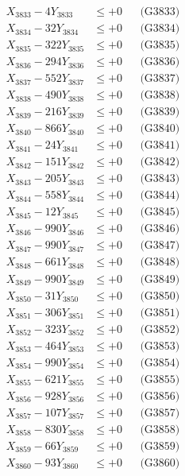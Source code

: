 \documentclass[a4paper,10pt]{article}
\begin{document}
{\begin{align}
X_{3833} - 4Y_{3833} &\leq +0 && \text{(G3833)} \\
X_{3834} - 32Y_{3834} &\leq +0 && \text{(G3834)} \\
X_{3835} - 322Y_{3835} &\leq +0 && \text{(G3835)} \\
X_{3836} - 294Y_{3836} &\leq +0 && \text{(G3836)} \\
X_{3837} - 552Y_{3837} &\leq +0 && \text{(G3837)} \\
X_{3838} - 490Y_{3838} &\leq +0 && \text{(G3838)} \\
X_{3839} - 216Y_{3839} &\leq +0 && \text{(G3839)} \\
X_{3840} - 866Y_{3840} &\leq +0 && \text{(G3840)} \\
\allowbreak
X_{3841} - 24Y_{3841} &\leq +0 && \text{(G3841)} \\
X_{3842} - 151Y_{3842} &\leq +0 && \text{(G3842)} \\
X_{3843} - 205Y_{3843} &\leq +0 && \text{(G3843)} \\
X_{3844} - 558Y_{3844} &\leq +0 && \text{(G3844)} \\
X_{3845} - 12Y_{3845} &\leq +0 && \text{(G3845)} \\
X_{3846} - 990Y_{3846} &\leq +0 && \text{(G3846)} \\
X_{3847} - 990Y_{3847} &\leq +0 && \text{(G3847)} \\
X_{3848} - 661Y_{3848} &\leq +0 && \text{(G3848)} \\
X_{3849} - 990Y_{3849} &\leq +0 && \text{(G3849)} \\
X_{3850} - 31Y_{3850} &\leq +0 && \text{(G3850)} \\
\allowbreak
X_{3851} - 306Y_{3851} &\leq +0 && \text{(G3851)} \\
X_{3852} - 323Y_{3852} &\leq +0 && \text{(G3852)} \\
X_{3853} - 464Y_{3853} &\leq +0 && \text{(G3853)} \\
X_{3854} - 990Y_{3854} &\leq +0 && \text{(G3854)} \\
X_{3855} - 621Y_{3855} &\leq +0 && \text{(G3855)} \\
X_{3856} - 928Y_{3856} &\leq +0 && \text{(G3856)} \\
X_{3857} - 107Y_{3857} &\leq +0 && \text{(G3857)} \\
X_{3858} - 830Y_{3858} &\leq +0 && \text{(G3858)} \\
X_{3859} - 66Y_{3859} &\leq +0 && \text{(G3859)} \\
X_{3860} - 93Y_{3860} &\leq +0 && \text{(G3860)} \\

\end{align}}
\end{document}
